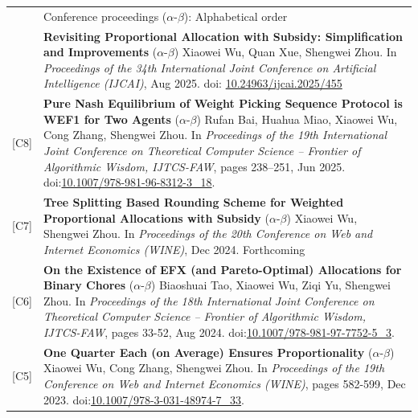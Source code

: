 \documentclass[letterpaper, 11pt]{article}
\newcommand{\headingfont}{\Large\color{OliveGreen}}
\newenvironment{SectionTable}[1]{
	\renewcommand*{\arraystretch}{1.2}
	\setlength{\tabcolsep}{8pt}
	\begin{longtable}{Rp{6.2in}} & #1 \\}
{\end{longtable}\vspace{-.7cm}}
\begin{document}
\begin{SectionTable}{\headingfont Conference proceedings \; \small\color{black}  ($\alpha$-$\beta$): Alphabetical order}
[C9] & 
\textbf{Revisiting Proportional Allocation with Subsidy: Simplification and Improvements} \newline
($\alpha$-$\beta$) Xiaowei Wu, Quan Xue, Shengwei Zhou.  \newline
In \textit{Proceedings of the 34th International Joint Conference on Artificial Intelligence (IJCAI)}, Aug 2025. doi: \href{https://doi.org/10.24963/ijcai.2025/455}{10.24963/ijcai.2025/455}\\

[C8] & 
\textbf{Pure Nash Equilibrium of Weight Picking Sequence Protocol is WEF1 for Two Agents} \newline
($\alpha$-$\beta$) Rufan Bai, Huahua Miao, Xiaowei Wu, Cong Zhang, Shengwei Zhou.  \newline
In \textit{Proceedings of the 19th International Joint Conference on Theoretical Computer Science – Frontier of Algorithmic Wisdom, IJTCS-FAW}, pages 238–251, Jun 2025. doi:\href{https://link.springer.com/chapter/10.1007/978-981-96-8312-3_18}{10.1007/978-981-96-8312-3\_18}. \\

[C7] & 
\textbf{Tree Splitting Based Rounding Scheme for Weighted Proportional Allocations with Subsidy} \newline
($\alpha$-$\beta$) Xiaowei Wu, Shengwei Zhou.  \newline
In \textit{Proceedings of the 20th Conference on Web and Internet Economics (WINE)}, Dec 2024. Forthcoming \\

\vspace{-0.48cm}\hypertarget{EFX-IJTCS24}{[C6]} & 
\textbf{On the Existence of EFX (and Pareto-Optimal) Allocations for Binary Chores} \newline
($\alpha$-$\beta$) Biaoshuai Tao, Xiaowei Wu, Ziqi Yu, Shengwei Zhou.  \newline
In \textit{Proceedings of the 18th International Joint Conference on Theoretical Computer Science – Frontier of Algorithmic Wisdom, IJTCS-FAW}, pages 33-52, Aug 2024. doi:\href{https://link.springer.com/chapter/10.1007/978-981-97-7752-5_3}{10.1007/978-981-97-7752-5\_3}.\\

[C5] & 
\textbf{One Quarter Each (on Average) Ensures Proportionality} \newline
($\alpha$-$\beta$) Xiaowei Wu, Cong Zhang, Shengwei Zhou.  \newline
In \textit{Proceedings of the 19th Conference on Web and Internet Economics (WINE)}, pages 582-599, Dec 2023. doi:\href{https://link.springer.com/chapter/10.1007/978-3-031-48974-7_33}{10.1007/978-3-031-48974-7\_33}.\\


\end{SectionTable}
\end{document}
